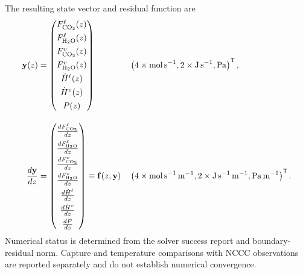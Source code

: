                 The resulting state vector and residual function are
                \begin{align}
                    \mathbf{y}(z) &=
                    \begin{pmatrix}
                        F^{\liq}_{\mathrm{CO_2}}(z)\\[4pt]
                        F^{\liq}_{\mathrm{H_2O}}(z)\\[4pt]
                        F^{\vap}_{\mathrm{CO_2}}(z)\\[4pt]
                        F^{\vap}_{\mathrm{H_2O}}(z)\\[4pt]
                        \dot{H}^{\liq}(z)\\[4pt]
                        \dot{H}^{\vap}(z)\\[4pt]
                        P(z)
                    \end{pmatrix}
                    && \left(
                    4\times\unit{mol\,s^{-1}},
                    2\times\unit{J\,s^{-1}},
                    \unit{Pa}
                    \right)^{\mathsf{T}},\\[1em]
                    \frac{d\mathbf{y}}{dz} &=
                    \begin{pmatrix}
                        \frac{d F^{\liq}_{ \COtwo}}{d z} \\[4pt]
                        \frac{d F^{\liq}_{ \HtwoO}}{d z} \\[4pt]
                        \frac{d F^{\vap}_{ \COtwo}}{d z} \\[4pt]
                        \frac{d F^{\vap}_{ \HtwoO}}{d z} \\[4pt]
                        \frac{d \dot{H}^{\liq}}{d z} \\[4pt]
                        \frac{d \dot{H}^{\vap}}{d z}\\[4pt]
                        \frac{dP}{dz}
                    \end{pmatrix}
                    \equiv
                    \mathbf{f}(z, \mathbf{y})
                    && \left(
                    4\times\unit{mol\,s^{-1}\,m^{-1}},
                    2\times\unit{J\,s^{-1}\,m^{-1}},
                    \unit{Pa\,m^{-1}}
                    \right)^{\mathsf{T}}.
                \end{align}
                Numerical status is determined from the solver success report and boundary-residual norm. Capture and temperature comparisons with NCCC observations are reported separately and do not establish numerical convergence.

